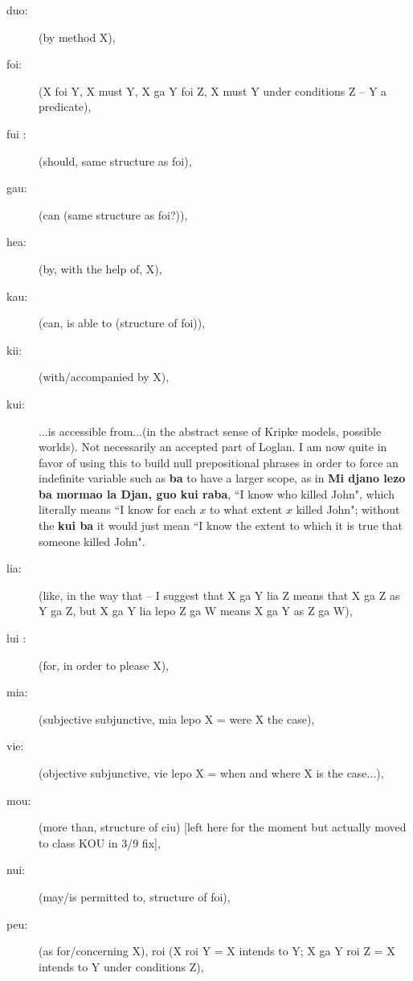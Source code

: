 \documentclass[12pt]{book}
\begin{document}
\begin{description}
\item[duo:]  (by method X), 

\item[foi:]   (X foi Y, X must Y, X ga Y foi Z, X must Y under conditions Z  -- Y a predicate), 

\item[fui :]  (should, same structure as foi), 

\item[gau:] (can (same structure as foi?)), 

\item[hea:]  (by, with the help of, X), 

\item[kau:] (can, is able to (structure of foi)), 

\item[kii:]  (with/accompanied by X), 

\item[kui:] ...is accessible from...(in the abstract sense of Kripke models, possible worlds).  Not necessarily an accepted part of Loglan.  I am now quite in favor of using this to build null prepositional phrases in order to force an indefinite variable such as {\bf ba} to have a larger scope, as in
{\bf Mi djano lezo ba mormao la Djan, guo kui raba}, ``I know who killed John", which literally means ``I know for each $x$ to what extent $x$ killed John"; without the {\bf kui ba} it would just mean ``I know the extent to which it is true that someone killed John".

\item[lia:]   (like, in the way that  -- I suggest that X ga Y lia Z means that X ga Z as Y ga Z, but X ga Y lia lepo Z ga W means X ga Y as Z ga W), 

\item[lui :] (for, in order to please X), 

\item[mia:]   (subjective subjunctive, mia lepo X = were X the case), 

\item[vie:]  (objective subjunctive, vie lepo X = when and where X is the case...),

\item[mou:]  (more than, structure of ciu) [left here for the moment but actually moved to class KOU in 3/9 fix],

\item[nui:]   (may/is permitted to, structure of foi), 

\item[peu:]  (as for/concerning X), roi (X roi Y = X intends to Y; X ga Y roi Z = X intends to Y under conditions Z), 


\end{description}
\end{document}
